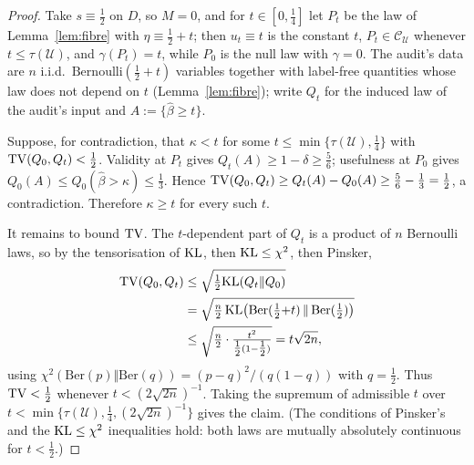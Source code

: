 \begin{proof}
Take $s\equiv\tfrac12$ on $D$, so $M=0$, and for $t\in[0,\tfrac14]$ let $P_t$ be the law of
Lemma~\ref{lem:fibre} with $\eta\equiv\tfrac12+t$; then $u_t\equiv t$ is the constant $t$,
$P_t\in\mathcal C_{\mathcal U}$ whenever $t\le\tau(\mathcal U)$, and $\gamma(P_t)=t$, while
$P_0$ is the null law with $\gamma=0$. The audit's data are $n$ i.i.d.\
$\mathrm{Bernoulli}(\tfrac12+t)$ variables together with label-free quantities whose law does
not depend on $t$ (Lemma~\ref{lem:fibre}); write $Q_t$ for the induced law of the audit's
input and $A:=\{\widehat\beta\ge t\}$.

Suppose, for contradiction, that $\kappa<t$ for some $t\le\min\{\tau(\mathcal U),\tfrac14\}$
with $\mathrm{TV}(Q_0,Q_t)<\tfrac12$. Validity at $P_t$ gives $Q_t(A)\ge1-\delta\ge\tfrac56$;
usefulness at $P_0$ gives $Q_0(A)\le Q_0(\widehat\beta>\kappa)\le\tfrac13$. Hence
$\mathrm{TV}(Q_0,Q_t)\ge Q_t(A)-Q_0(A)\ge\tfrac56-\tfrac13=\tfrac12$, a contradiction. Therefore
$\kappa\ge t$ for every such $t$.

It remains to bound $\mathrm{TV}$. The $t$-dependent part of $Q_t$ is a product of $n$ Bernoulli laws,
so by the tensorisation of $\mathrm{KL}$, then $\mathrm{KL}\le\chi^2$, then Pinsker,
\[
\begin{aligned}
\mathrm{TV}(Q_0,Q_t)&\le\sqrt{\tfrac12\mathrm{KL}(Q_t\Vert Q_0)}\\
&=\sqrt{\tfrac{n}{2}\,\mathrm{KL}\bigl(\mathrm{Ber}(\tfrac12{+}t)\,\Vert\,\mathrm{Ber}(\tfrac12)\bigr)}\\
&\le\sqrt{\tfrac{n}{2}\cdot\tfrac{t^2}{\tfrac12(1-\tfrac12)}}=t\sqrt{2n},
\end{aligned}
\]
using $\chi^2(\mathrm{Ber}(p)\Vert\mathrm{Ber}(q))=(p-q)^2/(q(1-q))$ with $q=\tfrac12$. Thus
$\mathrm{TV}<\tfrac12$ whenever $t<(2\sqrt{2n})^{-1}$. Taking the supremum of admissible $t$ over
$t<\min\{\tau(\mathcal U),\tfrac14,(2\sqrt{2n})^{-1}\}$ gives the claim.
(The conditions of Pinsker's and the $\mathrm{KL}\le\chi^2$ inequalities hold: both laws are
mutually absolutely continuous for $t<\tfrac12$.)
\end{proof}

